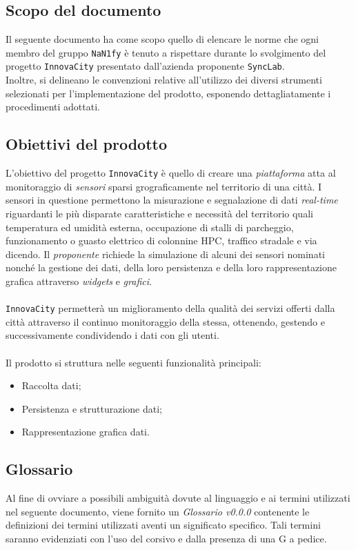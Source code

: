 \subsection{Scopo del documento}
Il seguente documento ha come scopo quello di elencare le norme che ogni membro del gruppo \texttt{NaN1fy} è tenuto a rispettare durante lo svolgimento del progetto \texttt{InnovaCity} presentato dall'azienda proponente \texttt{SyncLab}.\\
Inoltre, si delineano le convenzioni relative all'utilizzo dei diversi strumenti selezionati per l'implementazione del prodotto, esponendo dettagliatamente i procedimenti adottati.
\subsection{Obiettivi del prodotto}
L'obiettivo del progetto \texttt{InnovaCity} è quello di creare una \textit{piattaforma} atta al monitoraggio di \textit{sensori} sparsi grograficamente nel territorio di una città. I sensori in questione permettono la misurazione e segnalazione di dati \textit{real-time} riguardanti le più disparate caratteristiche e necessità del territorio quali temperatura ed umidità esterna, occupazione di stalli di parcheggio, funzionamento o guasto elettrico di colonnine HPC, traffico stradale e via dicendo. Il \textit{proponente} richiede la simulazione di alcuni dei sensori nominati nonché la gestione dei dati, della loro persistenza e della loro rappresentazione grafica attraverso \textit{widgets} e \textit{grafici}. \\\\\texttt{InnovaCity} permetterà un miglioramento della qualità dei servizi offerti dalla città attraverso il continuo monitoraggio della stessa, ottenendo, gestendo e successivamente condividendo i dati con gli utenti. 
\\\\
Il prodotto si struttura nelle seguenti funzionalità principali:
\begin{itemize}
	\setlength\itemsep{0em}
	\item Raccolta dati;
	\item Persistenza e strutturazione dati;
	\item Rappresentazione grafica dati.
\end{itemize}
\subsection{Glossario}
Al fine di ovviare a possibili ambiguità dovute al linguaggio e ai termini utilizzati nel seguente documento, viene fornito un \textit{Glossario v0.0.0} contenente le definizioni dei termini utilizzati aventi un significato specifico. Tali termini saranno evidenziati con l'uso del corsivo e dalla presenza di una G a pedice.

